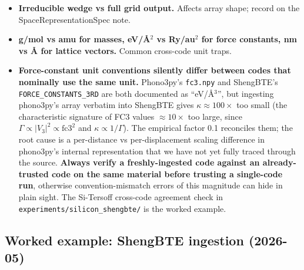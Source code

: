 \documentclass[11pt,a4paper]{article}
\begin{document}
\begin{itemize}[leftmargin=2em]
        kaldo (stable) is the exception. Record explicitly, do not assume.
  \item \textbf{Irreducible wedge vs full grid output.} Affects array shape; record
        on the SpaceRepresentationSpec note.
  \item \textbf{g/mol vs amu for masses, eV/\AA{}$^2$ vs Ry/au$^2$ for force
        constants, nm vs \AA{} for lattice vectors.} Common cross-code unit traps.
  \item \textbf{Force-constant unit conventions silently differ between codes that
        nominally use the same unit.} Phono3py's \texttt{fc3.npy} and ShengBTE's
        \texttt{FORCE\_CONSTANTS\_3RD} are both documented as ``eV/\AA{}$^3$'', but
        ingesting phono3py's array verbatim into ShengBTE gives $\kappa \approx
        100\times$ too small (the characteristic signature of FC3 values $\approx
        10\times$ too large, since $\Gamma \propto |V_3|^2 \propto \mathrm{fc3}^2$
        and $\kappa \propto 1/\Gamma$). The empirical factor 0.1 reconciles them;
        the root cause is a per-distance vs per-displacement scaling difference in
        phono3py's internal representation that we have not yet fully traced through
        the source. \textbf{Always verify a freshly-ingested code against an
        already-trusted code on the same material before trusting a single-code
        run}, otherwise convention-mismatch errors of this magnitude can hide in
        plain sight. The Si-Tersoff cross-code agreement check in
        \texttt{experiments/silicon\_shengbte/} is the worked example.
\end{itemize}

\subsection{Worked example: ShengBTE ingestion (2026-05)}
\end{document}
